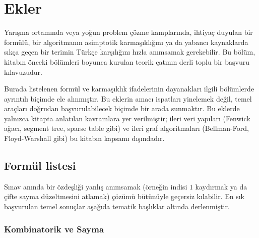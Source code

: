 \chapter{Ekler}

Yarışma ortamında veya yoğun problem çözme kamplarında, ihtiyaç duyulan bir formülü, bir algoritmanın asimptotik karmaşıklığını ya da yabancı kaynaklarda sıkça geçen bir terimin Türkçe karşılığını hızla anımsamak gerekebilir. Bu bölüm, kitabın önceki bölümleri boyunca kurulan teorik çatının derli toplu bir başvuru kılavuzudur.

Burada listelenen formül ve karmaşıklık ifadelerinin dayanakları ilgili bölümlerde ayrıntılı biçimde ele alınmıştır. Bu eklerin amacı ispatları yinelemek değil, temel araçları doğrudan başvurulabilecek biçimde bir arada sunmaktır. Bu eklerde yalnızca kitapta anlatılan kavramlara yer verilmiştir; ileri veri yapıları (Fenwick ağacı, segment tree, sparse table gibi) ve ileri graf algoritmaları (Bellman-Ford, Floyd-Warshall gibi) bu kitabın kapsamı dışındadır.

\section{Formül listesi}

Sınav anında bir özdeşliği yanlış anımsamak (örneğin indisi $1$ kaydırmak ya da çifte sayma düzeltmesini atlamak) çözümü bütünüyle geçersiz kılabilir. En sık başvurulan temel sonuçlar aşağıda tematik başlıklar altında derlenmiştir.

\subsection{Kombinatorik ve Sayma}


